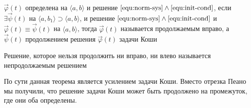 \begin{definition} 
	$\Vec{\varphi}(t)$ определена на $\langle a, b\rangle$ и решение $\eqref{equ:norm-sys} \wedge \eqref{equ:init-cond}$, если $\exists \Vec{\psi}(t)$ на $\langle a, b_1\rangle \supset \langle a, b\rangle$, и решение $\eqref{equ:norm-sys} \wedge \eqref{equ:init-cond}$ и $\Vec{\varphi}(t) \equiv \Vec{\psi}(t)$ на $\langle a, b\rangle$, тогда $\Vec{\varphi}(t)$ называется продолжаемым вправо, а $\Vec{\psi}(t)$ продолжением решения $\Vec{\varphi}(t)$ задачи Коши
\end{definition}

\begin{definition} 
	Решение, которое нельзя продолжить ни вправо, ни влево называется непродолжаемым решением
\end{definition}

\begin{remark}
	По сути данная теорема является усилением задачи Коши. Вместо отрезка Пеано мы получили, что решение задачи Коши может быть продолжено на промежуток, где они оба определены.
\end{remark}

